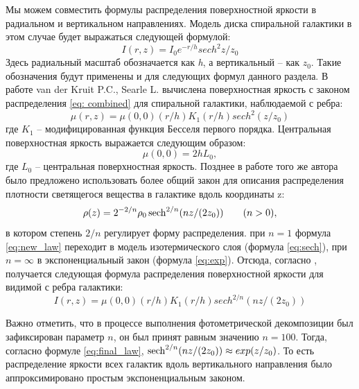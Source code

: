 Мы можем совместить формулы распределения поверхностной яркости в радиальном и вертикальном направлениях. Модель диска спиральной галактики в этом случае будет выражаться следующей формулой:
\begin{equation}
    I(r,z) = I_0e^{-r/h}sech^2{z/z_0}
    \label{eq: combined}
\end{equation}
Здесь радиальный масштаб обозначается как \textit{h}, а вертикальный – как $z_0$. Такие обозначения будут применены и для следующих формул данного раздела.
В работе van der Kruit P.C., Searle L. \cite{1981A&A....95..105V} вычислена поверхностная яркость с законом распределения \ref{eq: combined} для спиральной галактики, наблюдаемой с ребра:
\begin{equation}
    \mu(r,z) = \mu(0,0)(r/h)K_1(r/h)sech^2(z/z_0)
    \label{vanderkruit}
\end{equation}
где $K_1$ -- модифицированная функция Бесселя первого порядка. Центральная поверхностная яркость выражается следующим образом:
\begin{equation}
    \mu(0,0) = 2hL_0,
\end{equation}
где $L_0$ -- центральная поверхностная яркость.
Позднее в работе того же автора \cite{1988A&A...192..117V} было предложено использовать более общий закон для описания распределения плотности светящегося вещества в галактике вдоль координаты z:
\begin{equation}
    \rho(z) = 2^{-2/n}\rho_0\operatorname{sech}^{2/n}(nz/(2z_0))\hspace{2em}(n>0), 
    \label{eq:new_law}
\end{equation}
в котором степень $2/n$ регулирует форму распределения.
при $n = 1$ формула \ref{eq:new_law} переходит в модель изотермического слоя (формула \ref{eq:sech}), при $n = \infty$ в экспоненциальный закон (формула \ref{eq:exp}).
Отсюда, согласно \cite{1988A&A...192..117V}, получается следующая формула распределения поверхностной яркости для видимой с ребра галактики:
\begin{equation}
    I(r,z) = \mu(0,0)(r/h)K_1(r/h)sech^{2/n}(nz/(2z_0))
    \label{eq:final_law}
\end{equation}

Важно отметить, что в процессе выполнения фотометрической декомпозиции был зафиксирован параметр $n$, он был принят равным значению $n = 100$. Тогда, согласно формуле \ref{eq:final_law}, $\operatorname{sech}^{2/n}(nz/(2z_0)) \approx exp(z/z_0)$. То есть распределение яркости всех галактик вдоль вертикального направления было аппроксимировано простым экспоненциальным законом.

